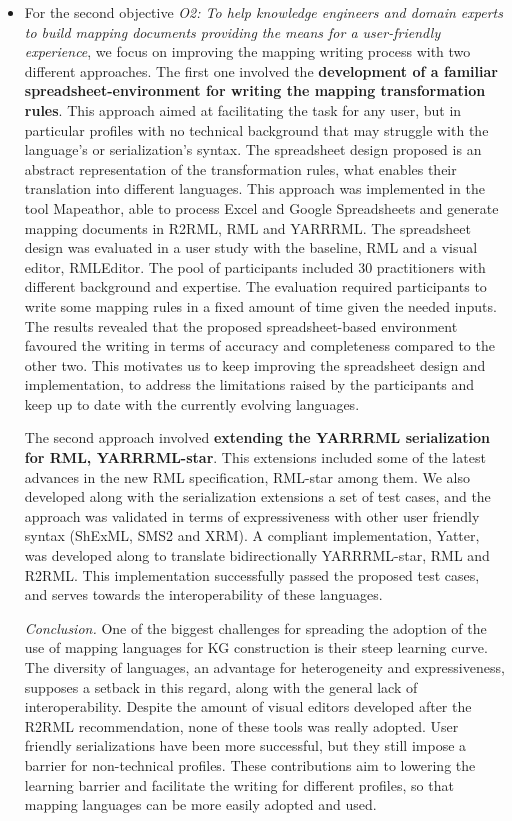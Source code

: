 \begin{itemize}
    \item For the second objective \textit{O2: To help knowledge engineers and domain experts to build mapping documents providing the means for a user-friendly experience}, we focus on improving the mapping writing process with two different approaches. 
    The first one involved the \textbf{development of a familiar spreadsheet-environment for writing the mapping transformation rules}. 
    This approach aimed at facilitating the task for any user, but in particular profiles with no technical background that may struggle with the language's or serialization's syntax. 
    The spreadsheet design proposed is an abstract representation of the transformation rules, what enables their translation into different languages. 
    This approach was implemented in the tool Mapeathor, able to process Excel and Google Spreadsheets and generate mapping documents in R2RML, RML and YARRRML. 
    The spreadsheet design was evaluated in a user study with the baseline, RML and a visual editor, RMLEditor. 
    The pool of participants included 30 practitioners with different background and expertise.
    The evaluation required participants to write some mapping rules in a fixed amount of time given the needed inputs. 
    The results revealed that the proposed spreadsheet-based environment favoured the writing in terms of accuracy and completeness compared to the other two.
    This motivates us to keep improving the spreadsheet design and implementation, to address the limitations raised by the participants and keep up to date with the currently evolving languages. 
    
    The second approach involved \textbf{extending the YARRRML serialization for RML, YARRRML-star}. 
    This extensions included some of the latest advances in the new RML specification, RML-star among them. 
    We also developed along with the serialization extensions a set of test cases, and the approach was validated in terms of expressiveness with other user friendly syntax (ShExML, SMS2 and XRM). 
    A compliant implementation, Yatter, was developed along to translate bidirectionally YARRRML-star, RML and R2RML. 
    This implementation successfully passed the proposed test cases, and serves towards the interoperability of these languages.
    
    \textit{Conclusion.} One of the biggest challenges for spreading the adoption of the use of mapping languages for KG construction is their steep learning curve. The diversity of languages, an advantage for heterogeneity and expressiveness, supposes a setback in this regard, along with the general lack of interoperability. Despite the amount of visual editors developed after the R2RML recommendation, none of these tools was really adopted. User friendly serializations have been more successful, but they still impose a barrier for non-technical profiles. These contributions aim to lowering the learning barrier and facilitate the writing for different profiles, so that mapping languages can be more easily adopted and used. 
\end{itemize}


